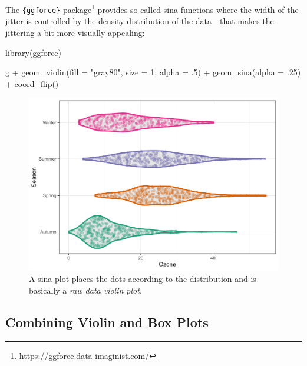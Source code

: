 \documentclass[
]{krantz}
\makeatletter
\newenvironment{Shaded}{\begin{snugshade}}{\end{snugshade}}
\newcommand{\AttributeTok}[1]{\textcolor[rgb]{0.61,0.61,0.61}{#1}}
\newcommand{\DecValTok}[1]{\textcolor[rgb]{0.06,0.06,0.06}{#1}}
\newcommand{\FunctionTok}[1]{\textcolor[rgb]{0,0,0}{#1}}
\newcommand{\NormalTok}[1]{#1}
\newcommand{\SpecialCharTok}[1]{\textcolor[rgb]{0,0,0}{#1}}
\newcommand{\StringTok}[1]{\textcolor[rgb]{0.5,0.5,0.5}{#1}}
\renewcommand{\href}[2]{#2\footnote{\url{#1}}}
\newenvironment{kframe}{%
\medskip{}
\setlength{\fboxsep}{.8em}
 \def\at@end@of@kframe{}%
 \ifinner\ifhmode%
  \def\at@end@of@kframe{\end{minipage}}%
  \begin{minipage}{\columnwidth}%
 \fi\fi%
 \def\FrameCommand##1{\hskip\@totalleftmargin \hskip-\fboxsep
 \colorbox{shadecolor}{##1}\hskip-\fboxsep
     \hskip-\linewidth \hskip-\@totalleftmargin \hskip\columnwidth}%
 \MakeFramed {\advance\hsize-\width
   \@totalleftmargin\z@ \linewidth\hsize
   \@setminipage}}%
 {\par\unskip\endMakeFramed%
 \at@end@of@kframe}
\renewenvironment{Shaded}{\begin{kframe}}{\end{kframe}}
\makeatother
\begin{document}
The \href{https://ggforce.data-imaginist.com/}{\texttt{\{ggforce\}} package} provides so-called sina functions where the width of the jitter is controlled by the density distribution of the data---that makes the jittering a bit more visually appealing:

\begin{Shaded}
\begin{Highlighting}[]
\FunctionTok{library}\NormalTok{(ggforce)}

\NormalTok{g }\SpecialCharTok{+} \FunctionTok{geom\_violin}\NormalTok{(}\AttributeTok{fill =} \StringTok{"gray80"}\NormalTok{, }\AttributeTok{size =} \DecValTok{1}\NormalTok{, }\AttributeTok{alpha =}\NormalTok{ .}\DecValTok{5}\NormalTok{) }\SpecialCharTok{+}
    \FunctionTok{geom\_sina}\NormalTok{(}\AttributeTok{alpha =}\NormalTok{ .}\DecValTok{25}\NormalTok{) }\SpecialCharTok{+}
    \FunctionTok{coord\_flip}\NormalTok{()}
\end{Highlighting}
\end{Shaded}

\begin{figure}
\centering
\includegraphics{bookdown_files/figure-latex/violin-sina-1.pdf}
\caption{\label{fig:violin-sina}A sina plot places the dots according to the distribution and is basically a \emph{raw data violin plot}.}
\end{figure}

\hypertarget{combining-violin-and-box-plots}{%
\subsection{Combining Violin and Box Plots}\label{combining-violin-and-box-plots}}
\end{document}
